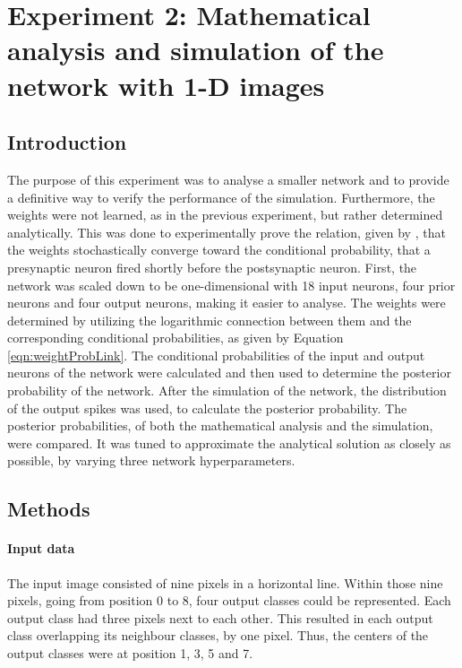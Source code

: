 \section{Experiment 2: Mathematical analysis and simulation of the network with 1-D images}
\label{section:1D}

\subsection{Introduction}

The purpose of this experiment was to analyse a smaller network and to provide a definitive way to verify the performance of the simulation. Furthermore, the weights were not learned, as in the previous experiment, but rather determined analytically. This was done to experimentally prove the relation, given by \citet{nessler}, that the weights stochastically converge toward the conditional probability, that a presynaptic neuron fired shortly before the postsynaptic neuron.
First, the network was scaled down to be one-dimensional with 18 input neurons, four prior neurons and four output neurons, making it easier to analyse. The weights were determined by utilizing the logarithmic connection between them and the corresponding conditional probabilities, as given by Equation \ref{eqn:weightProbLink}. The conditional probabilities of the input and output neurons of the network  were calculated and then used to determine the posterior probability of the network. After the simulation of the network, the distribution of the output spikes was used, to calculate the posterior probability. The posterior probabilities, of both the mathematical analysis and the simulation, were compared. It was tuned to approximate the analytical solution as closely as possible, by varying three network hyperparameters.

\subsection{Methods}

\paragraph{Input data}
The input image consisted of nine pixels in a horizontal line. Within those nine pixels, going from position 0 to 8, four output classes could be represented. Each output class had three pixels next to each other. This resulted in each output class overlapping its neighbour classes, by one pixel. Thus, the centers of the output classes were at position 1, 3, 5 and 7.
 
